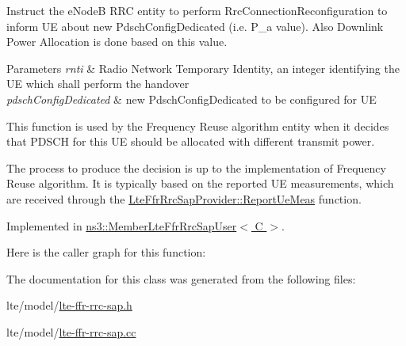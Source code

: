 Instruct the e\+NodeB R\+RC entity to perform Rrc\+Connection\+Reconfiguration to inform UE about new Pdsch\+Config\+Dedicated (i.\+e. P\+\_\+a value). Also Downlink Power Allocation is done based on this value. 


\begin{DoxyParams}{Parameters}
{\em rnti} & Radio Network Temporary Identity, an integer identifying the UE which shall perform the handover \\
\hline
{\em pdsch\+Config\+Dedicated} & new Pdsch\+Config\+Dedicated to be configured for UE\\
\hline
\end{DoxyParams}
This function is used by the Frequency Reuse algorithm entity when it decides that P\+D\+S\+CH for this UE should be allocated with different transmit power.

The process to produce the decision is up to the implementation of Frequency Reuse algorithm. It is typically based on the reported UE measurements, which are received through the \hyperlink{classns3_1_1LteFfrRrcSapProvider_aefa0779641b8432a7d3406b519ca7e59}{Lte\+Ffr\+Rrc\+Sap\+Provider\+::\+Report\+Ue\+Meas} function. 

Implemented in \hyperlink{classns3_1_1MemberLteFfrRrcSapUser_ad26c6bca4e9614ddad29e728b39b8a59}{ns3\+::\+Member\+Lte\+Ffr\+Rrc\+Sap\+User$<$ C $>$}.



Here is the caller graph for this function\+:




The documentation for this class was generated from the following files\+:\begin{DoxyCompactItemize}
\item 
lte/model/\hyperlink{lte-ffr-rrc-sap_8h}{lte-\/ffr-\/rrc-\/sap.\+h}\item 
lte/model/\hyperlink{lte-ffr-rrc-sap_8cc}{lte-\/ffr-\/rrc-\/sap.\+cc}\end{DoxyCompactItemize}
